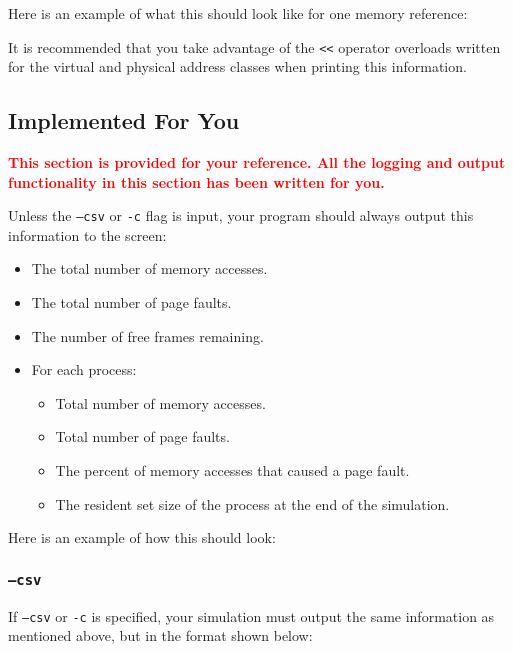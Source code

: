 \documentclass[10pt]{article}
\begin{document}
Here is an example of what this should look like for one memory reference:



It is recommended that you take advantage of the \texttt{<<} operator overloads written for the virtual and physical address classes when printing this information.

\subsection{Implemented For You}

\textcolor{red}{\textbf{This section is provided for your reference. All the logging and output functionality in this section has been written for you.}}

Unless the \texttt{--csv} or \texttt{-c} flag is input, your program should always output this information to the screen:

\begin{itemize}
    \item The total number of memory accesses.
    \item The total number of page faults.
    \item The number of free frames remaining.
    \item For each process:
    \begin{itemize}
        \item Total number of memory accesses.
        \item Total number of page faults.
        \item The percent of memory accesses that caused a page fault.
        \item The resident set size of the process at the end of the simulation.
    \end{itemize}
\end{itemize}

Here is an example of how this should look:



\subsubsection{\texttt{--csv}}

If \texttt{--csv} or \texttt{-c} is specified, your simulation must output the same information as mentioned above, but in the format shown below:
\end{document}
